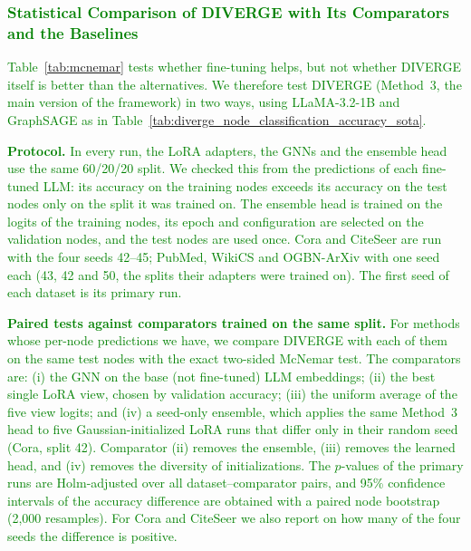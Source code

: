 \documentclass[a4paper,fleqn]{cas-sc}
\newcommand{\revthree}[1]{\textcolor{green}{#1}} %
\begin{document}
\subsubsection{\revthree{Statistical Comparison of DIVERGE with Its Comparators and the Baselines}}\label{sec:significance_baselines}

\revthree{Table~\ref{tab:mcnemar} tests whether fine-tuning helps, but not whether DIVERGE itself is better than the alternatives. We therefore test DIVERGE (Method~3, the main version of the framework) in two ways, using LLaMA-3.2-1B and GraphSAGE as in Table~\ref{tab:diverge_node_classification_accuracy_sota}.}

\revthree{\textbf{Protocol.} In every run, the LoRA adapters, the GNNs and the ensemble head use the same 60/20/20 split. We checked this from the predictions of each fine-tuned LLM: its accuracy on the training nodes exceeds its accuracy on the test nodes only on the split it was trained on. The ensemble head is trained on the logits of the training nodes, its epoch and configuration are selected on the validation nodes, and the test nodes are used once. Cora and CiteSeer are run with the four seeds 42--45; PubMed, WikiCS and OGBN-ArXiv with one seed each (43, 42 and 50, the splits their adapters were trained on). The first seed of each dataset is its primary run.}

\revthree{\textbf{Paired tests against comparators trained on the same split.} For methods whose per-node predictions we have, we compare DIVERGE with each of them on the same test nodes with the exact two-sided McNemar test. The comparators are: (i) the GNN on the base (not fine-tuned) LLM embeddings; (ii) the best single LoRA view, chosen by validation accuracy; (iii) the uniform average of the five view logits; and (iv) a seed-only ensemble, which applies the same Method~3 head to five Gaussian-initialized LoRA runs that differ only in their random seed (Cora, split 42). Comparator (ii) removes the ensemble, (iii) removes the learned head, and (iv) removes the diversity of initializations. The $p$-values of the primary runs are Holm-adjusted over all dataset--comparator pairs, and 95\% confidence intervals of the accuracy difference are obtained with a paired node bootstrap (2{,}000 resamples). For Cora and CiteSeer we also report on how many of the four seeds the difference is positive.}
\end{document}
